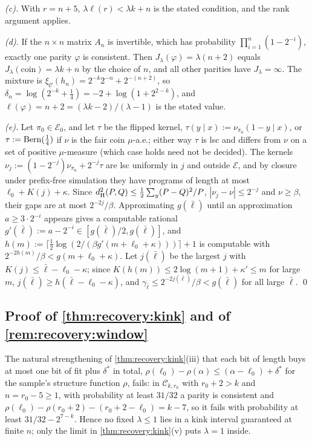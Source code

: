 \emph{(c).} With $r=n+5$, $\lambda\ell(r)<\lambda k+n$ is the stated condition, and the rank argument applies.

\emph{(d).} If the $n\times n$ matrix $A_n$ is invertible, which has probability $\prod_{i=1}^n(1-2^{-i})$, exactly one parity $\varphi$ is consistent. Then $J_\lambda(\varphi)=\lambda(n+2)$ equals $J_\lambda(\text{coin})=\lambda k+n$ by the choice of $n$, and all other parities have $J_\lambda=\infty$. The mixture is $\xi_{\mathcal C}(h_n)=2^{-k}2^{-n}+2^{-(n+2)}$, so $\delta_n=\log(2^{-k}+\frac14)=-2+\log(1+2^{2-k})$, and $\ell(\varphi)=n+2=(\lambda k-2)/(\lambda-1)$ is the stated value.

\emph{(e).} Let $\pi_0\in\mathcal E_0$, and let $\tau$ be the flipped kernel, $\tau(y\mid x):=\nu_{\pi_0}(1-y\mid x)$, or $\tau:=\operatorname{Bern}(\frac14)$ if $\nu$ is the fair coin $\mu$-a.e.; either way $\tau$ is lsc and differs from $\nu$ on a set of positive $\mu$-measure (which case holds need not be decided). The kernels $\nu_j:=(1-2^{-j})\nu_{\pi_0}+2^{-j}\tau$ are lsc uniformly in $j$ and outside $\mathcal E$, and by closure under prefix-free simulation they have programs of length at most $\ell_0+K(j)+\kappa$. Since $d_{\mathrm{H}}^{2}(P,Q)\le\frac12\sum_y(P-Q)^2/P$, $|\nu_j-\nu|\le2^{-j}$ and $\nu\ge\beta$, their gaps are at most $2^{-2j}/\beta$. Approximating $g(\bar\ell)$ until an approximation $a\ge3\cdot2^{-i}$ appears gives a computable rational $g'(\bar\ell):=a-2^{-i}\in[g(\bar\ell)/2,g(\bar\ell)]$, and $h(m):=\lceil\frac12\log(2/(\beta g'(m+\ell_0+\kappa)))\rceil+1$ is computable with $2^{-2h(m)}/\beta<g(m+\ell_0+\kappa)$. Let $j(\bar\ell)$ be the largest $j$ with $K(j)\le\bar\ell-\ell_0-\kappa$; since $K(h(m))\le2\log(m+1)+\kappa'\le m$ for large $m$, $j(\bar\ell)\ge h(\bar\ell-\ell_0-\kappa)$, and $\gamma_{\bar\ell}\le2^{-2j(\bar\ell)}/\beta<g(\bar\ell)$ for all large $\bar\ell$. \qed

\subsection{Proof of \texorpdfstring{\cref{thm:recovery:kink}}{the sample-kink theorem} and of \texorpdfstring{\cref{rem:recovery:window}}{the window remark}}\label{app:recovery:kink}

\begin{remark}\label{rem:recovery:window}
The natural strengthening of \cref{thm:recovery:kink}(iii) that each bit of length buys at most one bit of fit plus $\delta^*$ in total, $\rho(\ell_0)-\rho(\alpha)\le(\alpha-\ell_0)+\delta^*$ for the sample's structure function $\rho$, fails: in $\mathcal C_{k,r_0}$ with $r_0+2>k$ and $n=r_0-5\ge1$, with probability at least $31/32$ a parity is consistent and $\rho(\ell_0)-\rho(r_0+2)-(r_0+2-\ell_0)=k-7$, so it fails with probability at least $31/32-2^{7-k}$. Hence no fixed $\lambda\le1$ lies in a kink interval guaranteed at finite $n$; only the limit in \cref{thm:recovery:kink}(v) puts $\lambda=1$ inside.
\end{remark}

